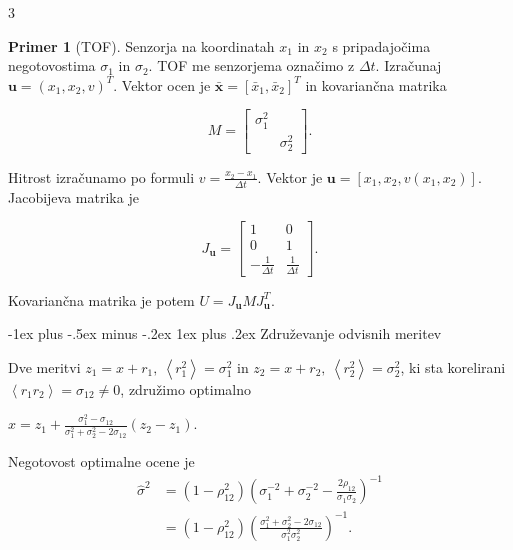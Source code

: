 \documentclass[10pt,landscape]{article}
\makeatletter
\renewcommand{\subsubsection}{\@startsection{subsubsection}{3}{0mm}%
	{-1ex plus -.5ex minus -.2ex}%
	{1ex plus .2ex}%
	{\normalfont\small\bfseries}}
\theoremstyle{definition}
\newtheorem*{primer}{Primer}
\makeatother
\begin{document}
\begin{multicols}{3}
\begin{primer}[TOF]
  Senzorja na koordinatah \( x_1 \) in \( x_2 \) s pripadajočima negotovostima \( \sigma_1 \) in \( \sigma_2 \). TOF me senzorjema označimo z \( \Delta t \). Izračunaj \( \mathbf{u} = \left( x_1, x_2, v \right)^T \). Vektor ocen je \( \bar{\mathbf{x}} = [\bar{x}_1, \bar{x}_2]^T \) in kovariančna matrika

  \[ M = \begin{bmatrix}
         \sigma_{1} ^2 &  \\
          & \sigma_2 ^2
          \end{bmatrix}.
  \]

  Hitrost izračunamo po formuli \( v = \frac{x_2 - x_1}{\Delta t} \). Vektor je \( \mathbf{u} = [x_1, x_2, v(x_1, x_2)] \). Jacobijeva matrika je

  \[ J_{\mathbf{u}} = \begin{bmatrix}
                      1 & 0 \\
    0 & 1 \\
   - \frac{1}{\Delta t} & \frac{1}{\Delta t}
                       \end{bmatrix}.
  \]

  Kovariančna matrika je potem \( U = J_{\mathbf{u}} M J_{\mathbf{u}}^T \).
\end{primer}

\subsubsection{Združevanje odvisnih meritev}

Dve meritvi \( z_1 = x + r_1, \ \left\langle r_1 ^2 \right\rangle = \sigma_1 ^2 \) in \( z_2 = x + r_2, \ \left\langle r_2 ^2 \right\rangle = \sigma_2 ^2\), ki sta korelirani \( \left\langle r_1 r_2 \right\rangle = \sigma_{12} \ne 0 \), združimo optimalno

\( \hat{x} = z_1 + \frac{\sigma_1 ^2 - \sigma_{12}}{\sigma_1 ^2 + \sigma_2 ^2 - 2 \sigma_{12}} \left( z_2 - z_1 \right).
\)

Negotovost optimalne ocene je
\begin{align*}
  \hat{\sigma} ^2 &= \left( 1 - \rho_{12} ^2 \right) \left( \sigma_1 ^{-2} + \sigma_2 ^{-2} - \frac{2 \rho_{12}}{\sigma_1 \sigma_2} \right)^{-1}\\
  &= \left( 1- \rho_{12} ^2 \right) \left( \frac{\sigma_1 ^2 + \sigma_2 ^2 - 2 \sigma_{12}}{\sigma_1 ^2 \sigma_2 ^2} \right)^{-1}.
\end{align*}


\end{multicols}
\end{document}
